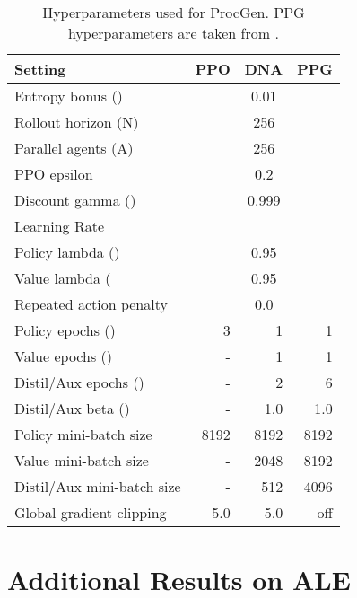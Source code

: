 \documentclass{article}
\begin{document}
\begin{table}[h]
    \centering
    \caption{Hyperparameters used for ProcGen. PPG hyperparameters are taken from \cite{cobbe2021phasic}.}
    \begin{tabular}{l r r r }
    \toprule
        Setting & PPO & DNA & PPG \\
    \midrule
Entropy bonus ()   & \multicolumn{3}{c}{0.01}\\ 
        Rollout horizon (N)             & \multicolumn{3}{c}{256}\\ 
        Parallel agents (A)             & \multicolumn{3}{c}{256}\\ 
        PPO epsilon           & \multicolumn{3}{c}{0.2}\\ 
        Discount gamma ()       & \multicolumn{3}{c}{0.999}\\ 
Learning Rate                   & \multicolumn{3}{c}{}\\
        
        Policy lambda ()   & \multicolumn{3}{c}{0.95}\\ 
        Value lambda (     & \multicolumn{3}{c}{0.95}\\  
        Repeated action penalty         & \multicolumn{3}{c}{0.0}\\ 
        \midrule
        Policy epochs ()         & 3 & 1 & 1 \\
        Value epochs ()            & - & 1 & 1 \\
        Distil/Aux epochs ()       & - & 2 & 6 \\
        Distil/Aux beta ()       & - & 1.0 & 1.0 \\
        
        Policy mini-batch size          & 8192 & 8192 & 8192 \\ 
        Value mini-batch size           & - & 2048    & 8192 \\
        Distil/Aux mini-batch size      & -  & 512    & 4096 \\
        Global gradient clipping        & 5.0 & 5.0 & off \\  
    \bottomrule
    \end{tabular}
    \label{tab:procgen_hps}
\end{table}

\clearpage

\section{Additional Results on ALE}
\label{app:full}
\end{document}
